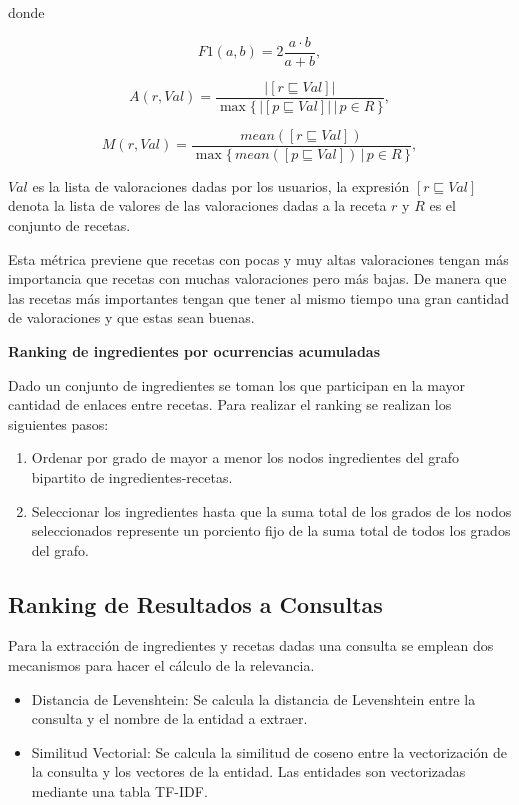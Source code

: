 \documentclass[
	a4paper, %
	10pt, %
	unnumberedsections, %
	twoside, %
]{LTJournalArticle}
\begin{document}
donde

\begin{equation*}
	F1(a, b) = 2 \frac{a · b}{a + b},
\end{equation*}

\begin{equation*}
	A(r, Val) = \frac{|[r \sqsubseteq Val]|}{\max \{\,|[p \sqsubseteq Val]| \, \vert \, p \in R \, \}},
\end{equation*}

\begin{equation*}
	M(r, Val) = \frac{mean([r \sqsubseteq Val])}{\max \{\,mean([p \sqsubseteq Val]) \, \vert \, p \in R\,\}},
\end{equation*}

$Val$ es la lista de valoraciones dadas por los usuarios, la expresión $[r \sqsubseteq Val]$ denota la lista de valores de 
las valoraciones dadas a la receta $r$ y $R$ es el conjunto de recetas.

Esta métrica previene que recetas con pocas y muy altas valoraciones tengan más importancia que recetas con muchas
valoraciones pero más bajas. De manera que las recetas más importantes tengan que tener al mismo tiempo una gran 
cantidad de valoraciones y que estas sean buenas. 

\textbf{Ranking de ingredientes por ocurrencias acumuladas}

Dado un conjunto de ingredientes se toman los que participan en la mayor cantidad de enlaces entre recetas.
Para realizar el ranking se realizan los siguientes pasos:

\begin{enumerate}
	\item Ordenar por grado de mayor a menor los nodos ingredientes del grafo bipartito de ingredientes-recetas.
	\item Seleccionar los ingredientes hasta que la suma total de los grados de los nodos seleccionados represente
	un porciento fijo de la suma total de todos los grados del grafo.
\end{enumerate}

\subsection{Ranking de Resultados a Consultas}

Para la extracción de ingredientes y recetas dadas una consulta se emplean dos mecanismos para hacer el cálculo
de la relevancia.

\begin{itemize}
	\item Distancia de Levenshtein: Se calcula la distancia de Levenshtein entre la consulta y el nombre de la 
	entidad a extraer.
	\item Similitud Vectorial: Se calcula la similitud de coseno entre la vectorización de la consulta y los
	vectores de la entidad. Las entidades son vectorizadas mediante una tabla TF-IDF. 
\end{itemize}
\end{document}
